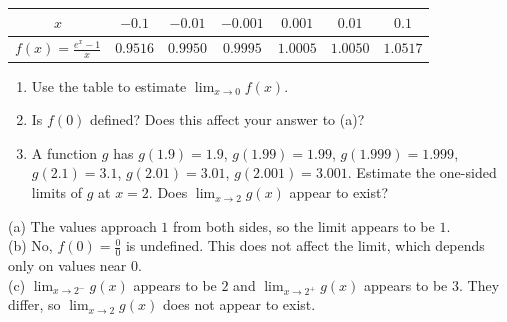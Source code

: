 \begin{exo}{}
\begin{center}\begin{tabular}{c|cccccc}$x$&$-0.1$&$-0.01$&$-0.001$&$0.001$&$0.01$&$0.1$\\\hline$f(x)=\frac{e^x-1}{x}$&$0.9516$&$0.9950$&$0.9995$&$1.0005$&$1.0050$&$1.0517$\end{tabular}\end{center}
\begin{enumerate}[label=(\alph*)]
\item Use the table to estimate $\displaystyle\lim_{x\to0}f(x)$.
\item Is $f(0)$ defined? Does this affect your answer to (a)?
\item A function $g$ has $g(1.9)=1.9$, $g(1.99)=1.99$, $g(1.999)=1.999$, $g(2.1)=3.1$, $g(2.01)=3.01$, $g(2.001)=3.001$. Estimate the one-sided limits of $g$ at $x=2$. Does $\displaystyle\lim_{x\to2}g(x)$ appear to exist?
\end{enumerate}
\begin{solution}
(a) The values approach $1$ from both sides, so the limit appears to be $1$.\\
(b) No, $f(0)=\frac00$ is undefined. This does not affect the limit, which depends only on values near $0$.\\
(c) $\lim_{x\to2^-}g(x)$ appears to be $2$ and $\lim_{x\to2^+}g(x)$ appears to be $3$. They differ, so $\lim_{x\to2}g(x)$ does not appear to exist.
\end{solution}
\end{exo}

